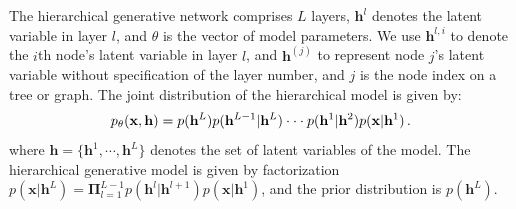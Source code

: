 \documentclass{article}
\begin{document}
The hierarchical generative network comprises $L$ layers, $\mathbf{h}^l$ denotes the latent variable in layer $l$, and $\theta$ is the vector of model parameters. We use $\mathbf{h}^{l, i}$ to denote the $i$th node's latent variable  in layer $l$, and $\mathbf{h}^{(j)}$ to represent node $j$'s latent variable without specification of the layer number, and $j$ is the node index on a tree or graph.  
The joint distribution of the hierarchical model is given by:
\begin{align}\notag %
p_{\theta}(\mathbf{x}, \mathbf{h}) = p( \mathbf{h}^{L}) p(\mathbf{h}^{L-1} | \mathbf{h}^{L}) \cdot \cdot  \cdot p(\mathbf{h}^{1} | \mathbf{h}^{2})  p(\mathbf{x} | \mathbf{h}^{1}) \, .
\end{align}%
where $\mathbf{h}=\{\mathbf{h}^1, \cdots, \mathbf{h}^L \}$ denotes the set of latent variables of the model. The hierarchical generative model is given by factorization $p(\mathbf{x}|\mathbf{h}^L) =  \mathbf{\Pi}_{l=1}^{L-1}p(\mathbf{h}^{l} | \mathbf{h}^{l+1}) p(\mathbf{x} | \mathbf{h}^{1}) $, and the prior distribution is $p(\mathbf{h}^L)$.
\end{document}
